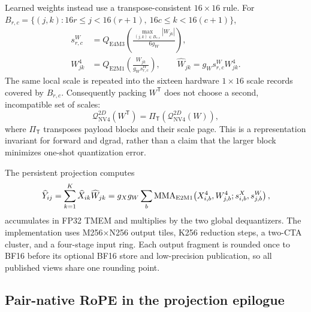 Learned weights instead use a transpose-consistent $16\times16$ rule.  For
$B_{r,c}=\{(j,k):16r\le j<16(r+1),\ 16c\le k<16(c+1)\}$,
\begin{align}
  s^W_{r,c}
    &=Q_{\mathrm{E4M3}}\!\left(
      \frac{\max_{(j,k)\in B_{r,c}}|W_{jk}|}{6g_W}
    \right),\\
  W^4_{jk}
    &=Q_{\mathrm{E2M1}}\!\left(
      \frac{W_{jk}}{g_Ws^W_{r,c}}
    \right),\qquad
  \widehat W_{jk}=g_Ws^W_{r,c}W^4_{jk}.
  \label{eq:nvfp4-projection-weight-2d}
\end{align}
The same local scale is repeated into the sixteen hardware $1\times16$
scale records covered by $B_{r,c}$.  Consequently packing $W^{\mathsf T}$
does not choose a second, incompatible set of scales:
\begin{equation}
  \mathcal Q^{2D}_{\mathrm{NV4}}(W^{\mathsf T})
  =\Pi_{\mathsf T}\!\left(
    \mathcal Q^{2D}_{\mathrm{NV4}}(W)
  \right),
  \label{eq:nvfp4-weight-transpose-consistency}
\end{equation}
where $\Pi_{\mathsf T}$ transposes payload blocks and their scale page.  This
is a representation invariant for forward and dgrad, rather than a claim
that the larger block minimizes one-shot quantization error.

The persistent projection computes
\begin{equation}
  \widehat Y_{ij}
  =\sum_{k=1}^{K}\widehat X_{ik}\widehat W_{jk}
  =g_Xg_W
   \sum_b
   \operatorname{MMA}_{\mathrm{E2M1}}\!\left(
     X^4_{i,b},W^4_{j,b};s^X_{i,b},s^W_{j,b}
   \right),
  \label{eq:nvfp4-projection}
\end{equation}
accumulates in FP32 TMEM and multiplies by the two global dequantizers.  The
implementation uses M256$\times$N256 output tiles, K256 reduction steps, a
two-CTA cluster, and a four-stage input ring.  Each output fragment is rounded
once to BF16 before its optional BF16 store and low-precision publication, so
all published views share one rounding point.

\subsection{Pair-native RoPE in the projection epilogue}

